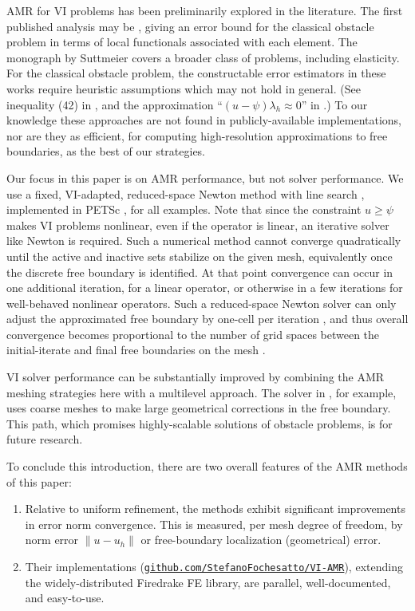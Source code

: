 \documentclass[]{interact}
\theoremstyle{plain}%
\theoremstyle{definition}
\theoremstyle{remark}
\begin{document}
AMR for VI problems has been preliminarily explored in the literature.  The first published analysis may be \cite{AinsworthOdenLee1993}, giving an error bound for the classical obstacle problem in terms of local functionals associated with each element.  The monograph by Suttmeier \cite{Suttmeier2008} covers a broader class of problems, including elasticity.  For the classical obstacle problem, the constructable error estimators in these works require heuristic assumptions which may not hold in general.  (See inequality (42) in \cite{AinsworthOdenLee1993}, and the approximation ``$(u-\psi)\lambda_h\approx 0$'' in \cite{Suttmeier2008}.)  To our knowledge these approaches are not found in publicly-available implementations, nor are they as efficient, for computing high-resolution approximations to free boundaries, as the best of our strategies.

Our focus in this paper is on AMR performance, but not solver performance.  We use a fixed, VI-adapted, reduced-space Newton method with line search \cite{BensonMunson2006}, implemented in PETSc \cite{petsc-user-ref}, for all examples.  Note that since the constraint $u \geq \psi$ makes VI problems nonlinear, even if the operator is linear, an iterative solver like Newton is required.  Such a numerical method cannot converge quadratically until the active and inactive sets stabilize on the given mesh, equivalently once the discrete free boundary is identified.  At that point convergence can occur in one additional iteration, for a linear operator, or otherwise in a few iterations for well-behaved nonlinear operators.  Such a reduced-space Newton solver can only adjust the approximated free boundary by one-cell per iteration \citep{GraeserKornhuber2009}, and thus overall convergence becomes proportional to the number of grid spaces between the initial-iterate and final free boundaries on the mesh \citep{Bueler2021}.

VI solver performance can be substantially improved by combining the AMR meshing strategies here with a multilevel approach.  The solver in \cite{BuelerFarrell2024}, for example, uses coarse meshes to make large geometrical corrections in the free boundary.  This path, which promises highly-scalable solutions of obstacle problems, is for future research.

To conclude this introduction, there are two overall features of the AMR methods of this paper:
\renewcommand{\labelenumi}{\arabic{enumi}.}
\begin{enumerate}
\item Relative to uniform refinement, the methods exhibit significant improvements in error norm convergence.  This is measured, per mesh degree of freedom, by norm error $\|u-u_h\|$ or free-boundary localization (geometrical) error.
\item Their implementations (\href{https://github.com/StefanoFochesatto/VI-AMR}{\texttt{github.com/StefanoFochesatto/VI-AMR}}), extending the widely-distributed Firedrake \cite{Langeetal2016} FE library, are parallel, well-documented, and easy-to-use.
\end{enumerate}
\end{document}
